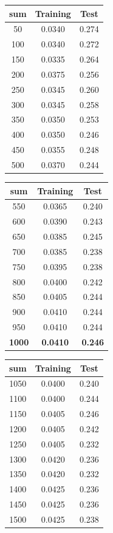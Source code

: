 \documentclass[10pt]{extarticle}
\begin{document}
\begin{minipage}{.25\textwidth}
	\begin{tabular}{c c c}
		sum & Training & Test\\ \hline
		50&0.0340&0.274\\
		100&0.0340&0.272\\
		150&0.0335&0.264\\
		200&0.0375&0.256\\
		250&0.0345&0.260\\
		300&0.0345&0.258\\
		350&0.0350&0.253\\
		400&0.0350&0.246\\
		450&0.0355&0.248\\
		500&0.0370&0.244
	\end{tabular}
\end{minipage}
\begin{minipage}{.25\textwidth}
	\begin{tabular}{c c c}
		sum & Training & Test\\ \hline
		550&0.0365&0.240\\
		600&0.0390&0.243\\
		650&0.0385&0.245\\
		700&0.0385&0.238\\
		750&0.0395&0.238\\
		800&0.0400&0.242\\
		850&0.0405&0.244\\
		900&0.0410&0.244\\
		950&0.0410&0.244\\
		\textbf{1000}&\textbf{0.0410}&\textbf{0.246}\\
	\end{tabular}
\end{minipage}
\begin{minipage}{.25\textwidth}
	\begin{tabular}{c c c}
		sum & Training & Test\\ \hline
		1050&0.0400&0.240\\
		1100&0.0400&0.244\\
		1150&0.0405&0.246\\
		1200&0.0405&0.242\\
		1250&0.0405&0.232\\
		1300&0.0420&0.236\\
		1350&0.0420&0.232\\
		1400&0.0425&0.236\\
		1450&0.0425&0.236\\
		1500&0.0425&0.238	
	\end{tabular}
\end{minipage}
\end{document}
